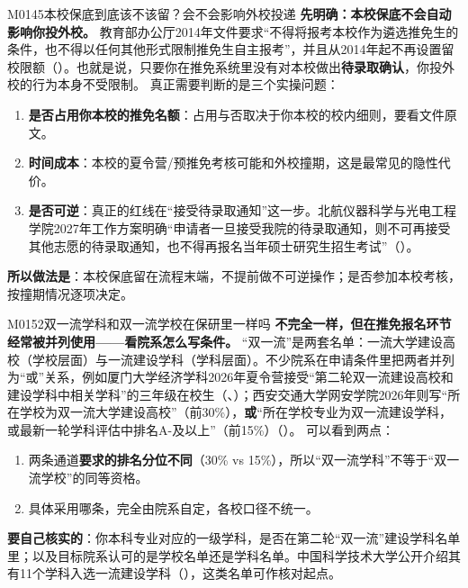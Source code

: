 \begin{qa}{M0145}{本校保底到底该不该留？会不会影响外校投递}
\textbf{先明确：本校保底不会自动影响你投外校。} 教育部办公厅2014年文件要求“不得将报考本校作为遴选推免生的条件，也不得以任何其他形式限制推免生自主报考”，并且从2014年起不再设置留校限额（）。也就是说，只要你在推免系统里没有对本校做出\textbf{待录取确认}，你投外校的行为本身不受限制。
真正需要判断的是三个实操问题：
\begin{enumerate}
  \item \textbf{是否占用你本校的推免名额}：占用与否取决于你本校的校内细则，要看文件原文。
  \item \textbf{时间成本}：本校的夏令营/预推免考核可能和外校撞期，这是最常见的隐性代价。
  \item \textbf{是否可逆}：真正的红线在“接受待录取通知”这一步。北航仪器科学与光电工程学院2027年工作方案明确“申请者一旦接受我院的待录取通知，则不可再接受其他志愿的待录取通知，也不得再报名当年硕士研究生招生考试”（）。
\end{enumerate}
\textbf{所以做法是}：本校保底留在流程末端，不提前做不可逆操作；是否参加本校考核，按撞期情况逐项决定。
\end{qa}

\begin{qa}{M0152}{双一流学科和双一流学校在保研里一样吗}
\textbf{不完全一样，但在推免报名环节经常被并列使用——看院系怎么写条件。}
“双一流”是两套名单：一流大学建设高校（学校层面）与一流建设学科（学科层面）。不少院系在申请条件里把两者并列为“或”关系，例如厦门大学经济学科2026年夏令营接受“第二轮双一流建设高校和建设学科中相关学科”的三年级在校生（、）；西安交通大学网安学院2026年则写“所在学校为双一流大学建设高校”（前30\%），\textbf{或}“所在学校专业为双一流建设学科，或最新一轮学科评估中排名A-及以上”（前15\%）（）。
可以看到两点：
\begin{enumerate}
  \item 两条通道\textbf{要求的排名分位不同}（30\% vs 15\%），所以“双一流学科”不等于“双一流学校”的同等资格。
  \item 具体采用哪条，完全由院系自定，各校口径不统一。
\end{enumerate}
\textbf{要自己核实的}：你本科专业对应的一级学科，是否在第二轮“双一流”建设学科名单里；以及目标院系认可的是学校名单还是学科名单。中国科学技术大学公开介绍其有11个学科入选一流建设学科（），这类名单可作核对起点。
\end{qa}


